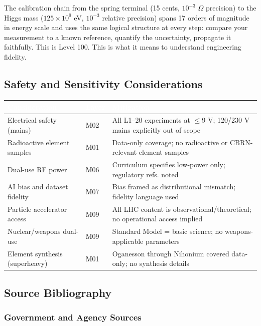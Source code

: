 \documentclass[11pt,letterpaper]{article}
\newcommand{\tableheader}[1]{\textbf{\sffamily\textcolor{white}{#1}}}
\begin{document}
The calibration chain from the spring terminal (15 cents, $10^{-3}$ $\Omega$ precision) to the
Higgs mass ($125 \times 10^9$ eV, $10^{-3}$ relative precision) spans 17 orders of magnitude in
energy scale and uses the same logical structure at every step: compare your measurement to a known
reference, quantify the uncertainty, propagate it faithfully. This is Level 100. This is what it
means to understand engineering fidelity.

\subsection{Safety and Sensitivity Considerations}

\begin{center}
\begin{tabularx}{\textwidth}{L{3.5cm}L{1.5cm}X}
\toprule
{}
\tableheader{Consideration} & \tableheader{Layer} & \tableheader{Mitigation} \\
\midrule
Electrical safety (mains) & M02 & All L1--20 experiments at $\leq$9 V; 120/230 V mains explicitly out of scope \\
Radioactive element samples & M01 & Data-only coverage; no radioactive or CBRN-relevant element samples \\
Dual-use RF power & M06 & Curriculum specifies low-power only; regulatory refs. noted \\
AI bias and dataset fidelity & M07 & Bias framed as distributional mismatch; fidelity language used \\
Particle accelerator access & M09 & All LHC content is observational/theoretical; no operational access implied \\
Nuclear/weapons dual-use & M09 & Standard Model = basic science; no weapons-applicable parameters \\
Element synthesis (superheavy) & M01 & Oganesson through Nihonium covered data-only; no synthesis details \\
\bottomrule
\end{tabularx}
\end{center}

\subsection{Source Bibliography}

\subsubsection{Government and Agency Sources}
\end{document}
